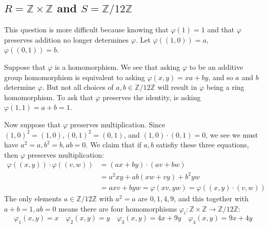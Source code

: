 \documentclass{amsart}
\newcommand{\Z}{\mathbb{Z}}
\begin{document}
\subsection*{$R=\Z\times\Z$ and $S=\Z/12\Z$} This question is more difficult because knowing that $\varphi(1)=1$ and that $\varphi$ preserves addition no longer determines $\varphi$.  Let $\varphi( (1,0))=a$, $\varphi((0,1))=b$.

Suppose that $\varphi$ is a homomorphism.  We see that asking $\varphi$ to be an additive group homomorphism is equivalent to asking $\varphi(x,y)=xa+by$, and so $a$ and $b$ determine $\varphi$.  But not all choices of $a, b\in\Z/12\Z$ will result in $\varphi$ being a ring homomorphism.  To ask that $\varphi$ preserves the identity, is asking $\varphi(1,1)=a+b=1$.

Now suppose that $\varphi$ preserves multiplication.  Since $(1,0)^2=(1,0), (0,1)^2=(0,1)$, and $(1,0)\cdot(0,1)=0$, we see we must have $a^2=a, b^2=b, ab=0$. We claim that if $a, b$ satisfiy these three equations, then $\varphi$ preserves multiplication:
\begin{equation*}
\begin{split}
  \varphi((x,y))\cdot\varphi((v,w))& =(ax+by)\cdot (av+bw)\\
  &=a^2xy+ab(xw+vy)+b^2yw\\
  &=axv+byw=\varphi(xv,yw)=\varphi((x,y)\cdot (v,w))
  \end{split}
\end{equation*}
The only elements $a\in\Z/12\Z$ with $a^2=a$ are $0,1,4,9$, and this together with $a+b=1, ab=0$ means there are four homomorphisms $\varphi_i:\Z\times\Z\to\Z/12\Z$:
$$\varphi_1(x,y)=x \quad \varphi_2(x,y)=y \quad \varphi_3(x,y)=4x+9y\quad\varphi_4(x,y)=9x+4y$$
\end{document}
